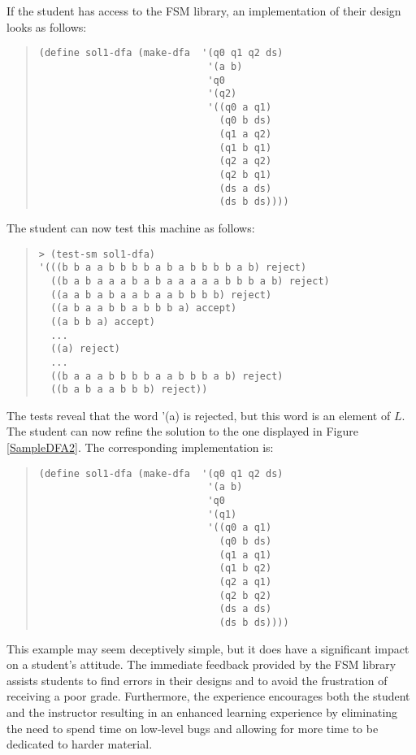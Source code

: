 \documentclass{eptcs}
\begin{document}
If the student has access to the \textsf{FSM} library, an implementation of their design looks as follows:
\begin{quote}
\begin{verbatim}
(define sol1-dfa (make-dfa  '(q0 q1 q2 ds)
                             '(a b)
                             'q0
                             '(q2)
                             '((q0 a q1)
                               (q0 b ds)
                               (q1 a q2)
                               (q1 b q1)
                               (q2 a q2)
                               (q2 b q1)
                               (ds a ds)
                               (ds b ds))))
\end{verbatim}
\end{quote}
The student can now test this machine as follows:
\begin{quote}
\begin{verbatim}
> (test-sm sol1-dfa)
'(((b b a a b b b b a b a b b b b a b) reject)
  ((b a b a a a b a b a a a a a b b b a b) reject)
  ((a a b a b a a b a a b b b b) reject)
  ((a b a a b b a b b b a) accept)
  ((a b b a) accept)
  ...
  ((a) reject)
  ...
  ((b a a a b b b b a a b b b a b) reject)
  ((b a b a a b b b) reject))
\end{verbatim}
\end{quote}
The tests reveal that the word \textsf{'(a)} is rejected, but this word is an element of $L$. The student can now refine the solution to the one displayed in Figure \ref{SampleDFA2}. The corresponding implementation is:
\begin{quote}
\begin{verbatim}
(define sol1-dfa (make-dfa  '(q0 q1 q2 ds)
                             '(a b)
                             'q0
                             '(q1)
                             '((q0 a q1)
                               (q0 b ds)
                               (q1 a q1)
                               (q1 b q2)
                               (q2 a q1)
                               (q2 b q2)
                               (ds a ds)
                               (ds b ds))))
\end{verbatim}
\end{quote}

This example may seem deceptively simple, but it does have a significant impact on a student's attitude. The immediate feedback provided by the \textsf{FSM} library assists students to find errors in their designs and to avoid the frustration of receiving a poor grade. Furthermore, the experience encourages both the student and the instructor resulting in an enhanced learning experience by eliminating the need to spend time on low-level bugs and allowing for more time to be dedicated to harder material.
\end{document}

